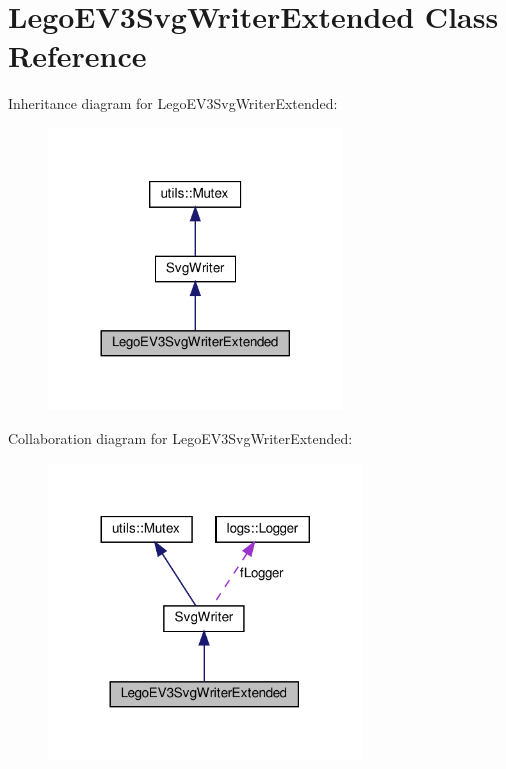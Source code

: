 \hypertarget{classLegoEV3SvgWriterExtended}{}\section{Lego\+E\+V3\+Svg\+Writer\+Extended Class Reference}
\label{classLegoEV3SvgWriterExtended}


Inheritance diagram for Lego\+E\+V3\+Svg\+Writer\+Extended\+:
\nopagebreak
\begin{figure}[H]
\begin{center}
\leavevmode
\includegraphics[width=221pt]{classLegoEV3SvgWriterExtended__inherit__graph}
\end{center}
\end{figure}


Collaboration diagram for Lego\+E\+V3\+Svg\+Writer\+Extended\+:
\nopagebreak
\begin{figure}[H]
\begin{center}
\leavevmode
\includegraphics[width=236pt]{classLegoEV3SvgWriterExtended__coll__graph}
\end{center}
\end{figure}
